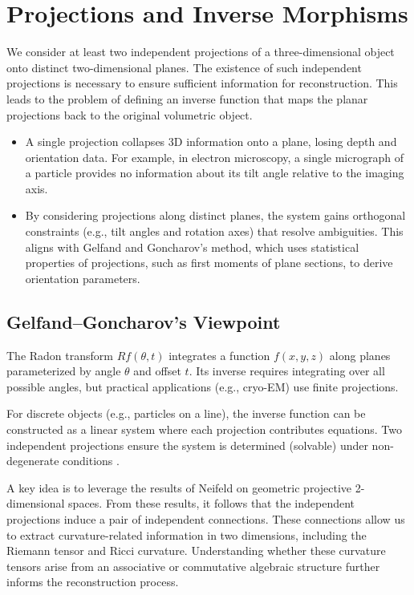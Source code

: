 \documentclass[runningheads]{llncs}
\begin{document}
\section{Projections and Inverse Morphisms}
 We consider at least two independent projections of a three-dimensional object onto distinct two-dimensional planes. The existence of such independent projections is necessary to ensure sufficient information for reconstruction. This leads to the problem of defining an inverse function that maps the planar projections back to the original volumetric object.

\begin{itemize}
\item A single projection collapses 3D information onto a plane, losing depth and orientation data. For example, in electron microscopy, a single micrograph of a particle provides no information about its tilt angle relative to the imaging axis.

\item By considering projections along distinct planes, the system gains orthogonal constraints (e.g., tilt angles and rotation axes) that resolve ambiguities. This aligns with Gelfand and Goncharov’s method, which uses statistical properties of projections, such as first moments of plane sections, to derive orientation parameters.
\end{itemize}

\subsection{Gelfand--Goncharov's Viewpoint}  The Radon transform $Rf(\theta,t)$ integrates a function 
$f(x,y,z)$ along planes parameterized by angle 
$\theta$ and offset $t$. Its inverse requires integrating over all possible angles, but practical applications (e.g., cryo-EM) use finite projections. 

 For discrete objects (e.g., particles on a line), the inverse function can be constructed as a linear system where each projection contributes equations. Two independent projections ensure the system is determined (solvable) under non-degenerate conditions \cite{GG}.

\medskip 

 A key idea is to leverage the results of Neifeld on geometric projective 2-dimensional spaces. From these results, it follows that the independent projections induce a pair of independent connections. These connections allow us to extract curvature-related information in two dimensions, including the Riemann tensor and Ricci curvature. Understanding whether these curvature tensors arise from an associative or commutative algebraic structure further informs the reconstruction process.
\end{document}
